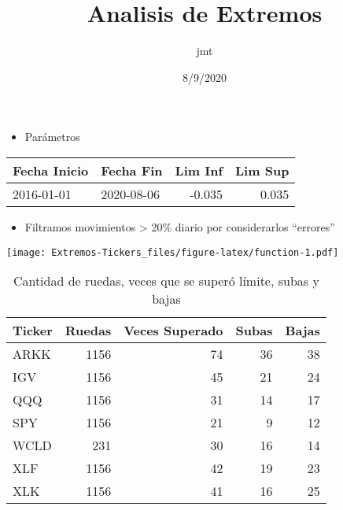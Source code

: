 \documentclass[
]{article}
\title{Analisis de Extremos}
\author{jmt}
\date{8/9/2020}
\providecommand{\tightlist}{%
  \setlength{\itemsep}{0pt}\setlength{\parskip}{0pt}}
\begin{document}
\maketitle

\begin{itemize}
\tightlist
\item
  Parámetros 
\end{itemize}

\begin{table}[H]
\centering
\begin{tabular}{l|l|r|r}
\hline
Fecha Inicio & Fecha Fin & Lim Inf & Lim Sup\\
\hline
2016-01-01 & 2020-08-06 & -0.035 & 0.035\\
\hline
\end{tabular}
\end{table}

\begin{itemize}
\tightlist
\item
  Filtramos movimientos \textgreater{} 20\% diario por considerarlos
  ``errores''
\end{itemize}

\texttt{[image: Extremos-Tickers\_files/figure-latex/function-1.pdf]}

\begin{table}

\caption{\label{tab:function2}Cantidad de ruedas, veces que se superó límite, subas y bajas}
\centering
\begin{tabular}[t]{l|r|r|r|r}
\hline
Ticker & Ruedas & Veces Superado & Subas & Bajas\\
\hline
ARKK & 1156 & 74 & 36 & 38\\
\hline
IGV & 1156 & 45 & 21 & 24\\
\hline
QQQ & 1156 & 31 & 14 & 17\\
\hline
SPY & 1156 & 21 & 9 & 12\\
\hline
WCLD & 231 & 30 & 16 & 14\\
\hline
XLF & 1156 & 42 & 19 & 23\\
\hline
XLK & 1156 & 41 & 16 & 25\\
\hline
\end{tabular}
\end{table}
\end{document}

